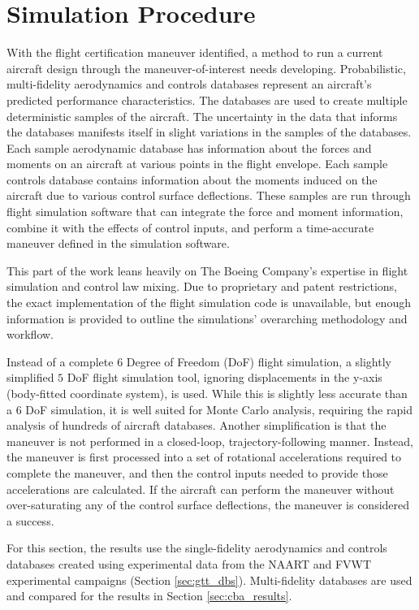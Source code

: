 \section{Simulation Procedure} \label{sec:sim_procedure}

With the flight certification maneuver identified, a method to run a current aircraft design through the maneuver-of-interest needs developing.
Probabilistic, multi-fidelity aerodynamics and controls databases represent an aircraft's predicted performance characteristics.
The databases are used to create multiple deterministic samples of the aircraft.
The uncertainty in the data that informs the databases manifests itself in slight variations in the samples of the databases.
Each sample aerodynamic database has information about the forces and moments on an aircraft at various points in the flight envelope.
Each sample controls database contains information about the moments induced on the aircraft due to various control surface deflections. 
These samples are run through flight simulation software that can integrate the force and moment information, combine it with the effects of control inputs, and perform a time-accurate maneuver defined in the simulation software. 

This part of the work leans heavily on The Boeing Company's expertise in flight simulation and control law mixing.
Due to proprietary and patent restrictions, the exact implementation of the flight simulation code is unavailable, but enough information is provided to outline the simulations' overarching methodology and workflow.

Instead of a complete $6$ Degree of Freedom (DoF) flight simulation, a slightly simplified $5$ DoF flight simulation tool, ignoring displacements in the y-axis (body-fitted coordinate system), is used.
While this is slightly less accurate than a $6$ DoF simulation, it is well suited for Monte Carlo analysis, requiring the rapid analysis of hundreds of aircraft databases.
Another simplification is that the maneuver is not performed in a closed-loop, trajectory-following manner. 
Instead, the maneuver is first processed into a set of rotational accelerations required to complete the maneuver, and then the control inputs needed to provide those accelerations are calculated. 
If the aircraft can perform the maneuver without over-saturating any of the control surface deflections, the maneuver is considered a success.

For this section, the results use the single-fidelity aerodynamics and controls databases created using experimental data from the NAART and FVWT experimental campaigns (Section \ref{sec:gtt_dbs}). 
Multi-fidelity databases are used and compared for the results in Section \ref{sec:cba_results}.

